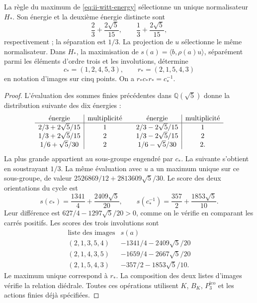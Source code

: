 \begin{proposition}
\label{prop:ii-witt-variational-selection}
La règle du maximum de \eqref{eq:ii-witt-energy} sélectionne un unique
normalisateur \(H_*\). Son énergie et la deuxième énergie distincte sont
\[
 \frac23+\frac{2\sqrt5}{15},\qquad
 \frac13+\frac{2\sqrt5}{15},
\]
respectivement ; la séparation est \(1/3\). La projection de \(u\)
sélectionne le même normalisateur. Dans \(H_*\), la maximisation de
\(s(a)=\langle b,\rho(a)u\rangle\), séparément parmi les éléments
d’ordre trois et les involutions, détermine
\[
 c_*=(1,2,4,5,3),\qquad r_*=(2,1,5,4,3)
\]
en notation d’images sur cinq points. On a
\(r_*c_*r_*=c_*^{-1}\).
\end{proposition}
\begin{proof}
L’évaluation des sommes finies précédentes dans \(\mathbb Q(\sqrt5)\)
donne la distribution suivante des dix énergies :
\[
\begin{array}{c|c@{\qquad}c|c}
\text{énergie}&\text{multiplicité}&\text{énergie}&\text{multiplicité}\\ \hline
2/3+2\sqrt5/15&1&2/3-2\sqrt5/15&1\\
1/3+2\sqrt5/15&2&1/3-2\sqrt5/15&2\\
1/6+\sqrt5/30&2&1/6-\sqrt5/30&2.
\end{array}
\]
La plus grande appartient au sous-groupe engendré par \(c_*\). La suivante
s’obtient en soustrayant \(1/3\). La même évaluation avec \(u\) a un maximum
unique sur ce sous-groupe, de valeur
\(2526869/12+2813609\sqrt5/30\).
Le score des deux orientations du cycle est
\[
 s(c_*)=\frac{1341}{4}+\frac{2409\sqrt5}{20},\qquad
 s(c_*^{-1})=\frac{357}{2}+\frac{1853\sqrt5}{10}.
\]
Leur différence est \(627/4-1297\sqrt5/20>0\), comme on le vérifie
en comparant les carrés positifs. Les scores des trois
involutions sont
\[
\begin{array}{c|c}
\text{liste des images}&s(a)\\ \hline
(2,1,3,5,4)&-1341/4-2409\sqrt5/20\\
(2,1,4,3,5)&-1659/4-2667\sqrt5/20\\
(2,1,5,4,3)&-357/2-1853\sqrt5/10.
\end{array}
\]
Le maximum unique correspond à \(r_*\). La composition des deux listes
d’images vérifie la relation diédrale. Toutes ces opérations utilisent
\(K\), \(B_K\), \(P_3^{\mathrm{ico}}\) et les actions finies déjà spécifiées.
\end{proof}

